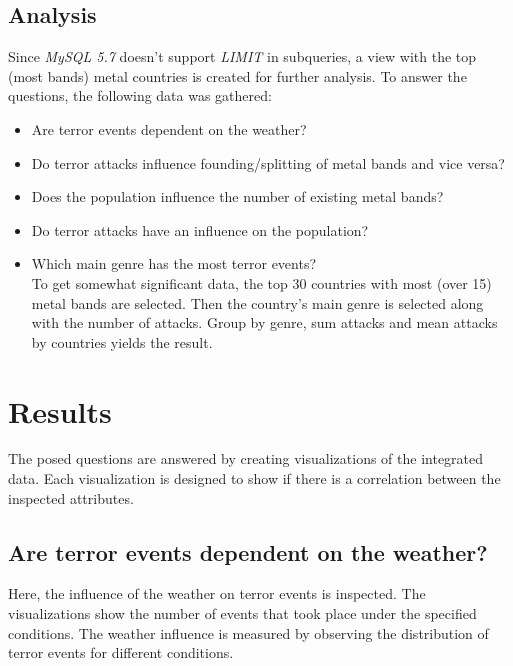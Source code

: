 \subsection{Analysis}
Since \emph{MySQL 5.7} doesn't support \emph{LIMIT} in subqueries, a view with the top (most bands) metal countries is created for further analysis. To answer the questions, the following data was gathered:
\begin{itemize}
\item Are terror events dependent on the weather?\\

\item Do terror attacks influence founding/splitting of metal bands and vice versa?\\

\item Does the population influence the number of existing metal bands?\\

\item Do terror attacks have an influence on the population?\\

\item Which main genre has the most terror events?\\
To get somewhat significant data, the top 30 countries with most (over 15) metal bands are selected. Then the country's main genre is selected along with the number of attacks. Group by genre, sum attacks and mean attacks by countries yields the result.
\end{itemize}



\section{Results}
The posed questions are answered by creating visualizations of the integrated data. Each visualization is designed to show if there is a correlation between the inspected attributes.

\subsection{Are terror events dependent on the weather?}
Here, the influence of the weather on terror events is inspected. The visualizations show the number of events that took place under the specified conditions. The weather influence is measured by observing the distribution of terror events for different conditions.

